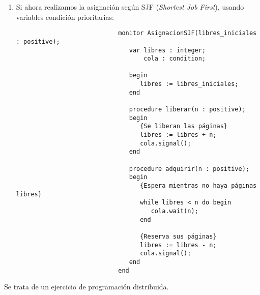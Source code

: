 \documentclass[12pt]{article}
\begin{document}
\begin{description}
\begin{ejercicio}
\begin{enumerate}[label=(\alph*)]
\begin{verbatim}
                                  {Reserva sus páginas}
                                  libres := libres - n;
                                  cola.signal();
                               end
                            end
                        \end{verbatim}
                    \item Si ahora realizamos la asignación según SJF (\textit{Shortest Job First}), usando variables condición prioritarias:
                        \begin{verbatim}
                            monitor AsignacionSJF(libres_iniciales : positive);
                               var libres : integer;
                                   cola : condition;

                               begin
                                  libres := libres_iniciales;
                               end

                               procedure liberar(n : positive);
                               begin
                                  {Se liberan las páginas}
                                  libres := libres + n;
                                  cola.signal();
                               end

                               procedure adquirir(n : positive);
                               begin
                                  {Espera mientras no haya páginas libres}
                                  while libres < n do begin
                                     cola.wait(n);
                                  end

                                  {Reserva sus páginas}
                                  libres := libres - n;
                                  cola.signal();
                               end
                            end
                        \end{verbatim}
                \end{enumerate}
            \end{ejercicio}

            \begin{ejercicio}
                Se trata de un ejercicio de programación distribuida.
            \end{ejercicio}
    \end{description}
\end{document}
